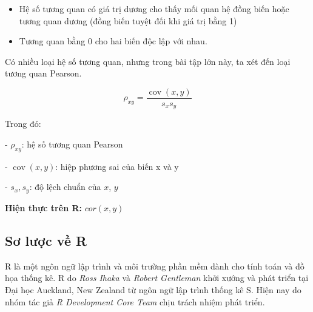 \documentclass[a4paper]{article}
\theoremstyle{definition}
\begin{document}
\begin{itemize}
\begin{itemize}
        \item Hệ số tương quan có giá trị dương cho thấy mối quan hệ đồng biến hoặc tương quan dương (đồng biến tuyệt đối khi giá trị bằng 1)

        \item Tương quan bằng 0 cho hai biến độc lập với nhau.
    \end{itemize}
    
    Có nhiều loại hệ số tương quan, nhưng trong bài tập lớn này, ta xét đến loại tương quan Pearson.
    
    \[{\rho _{xy}} = \frac{{\operatorname{cov} \left( {x,y} \right)}}{{{s_x}{s_y}}}\]
    
    Trong đó:
    
    - ${\rho _{xy}}$: hệ số tương quan Pearson 
        
    - ${\operatorname{cov} \left( {x,y} \right)}$: hiệp phương sai của biến x và y
        
    - ${s_x},{s_y}$: độ lệch chuẩn của $x$, $y$
        
    {\bf Hiện thực trên R:} $cor\left( {x,y} \right)$
    
\end{itemize}





\subsection{Sơ lược về R}
R là một ngôn ngữ lập trình và môi trường phần mềm dành cho tính toán và đồ họa thống kê. R do {\it Ross Ihaka} và {\it Robert Gentleman} khởi xướng và phát triển tại Đại học Auckland, New Zealand từ ngôn ngữ lập trình thống kê S. Hiện nay do nhóm tác giả {\it R Development Core Team} chịu trách nhiệm phát triển. 
\end{document}
